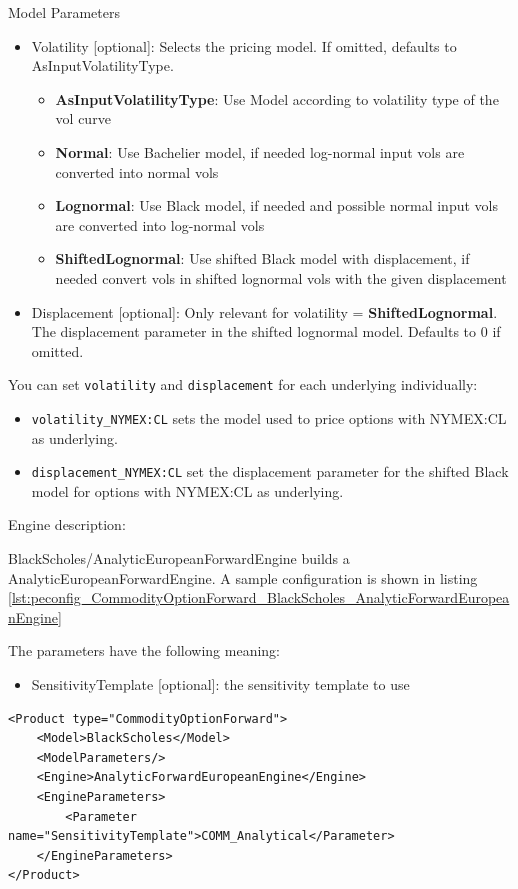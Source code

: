 Model Parameters
\begin{itemize}
    \item Volatility [optional]: Selects the pricing model. If omitted, defaults to AsInputVolatilityType.
    \begin{itemize}
        \item \textbf{AsInputVolatilityType}: Use Model according to volatility type of the vol curve
        \item \textbf{Normal}: Use Bachelier model, if needed log-normal input vols are converted into normal vols
        \item \textbf{Lognormal}: Use Black model, if needed and possible normal input vols are converted into log-normal vols
        \item \textbf{ShiftedLognormal}: Use shifted Black model with displacement, if needed convert vols in shifted lognormal vols with the given displacement
    \end{itemize}
    \item Displacement [optional]: Only relevant for volatility = \textbf{ShiftedLognormal}. The displacement parameter in the shifted lognormal model. Defaults to 0 if omitted.
\end{itemize}

You can set \texttt{volatility} and \texttt{displacement} for each underlying individually:
\begin{itemize}
    \item \texttt{volatility\_NYMEX:CL} sets the model used to price options with NYMEX:CL as underlying.
    \item \texttt{displacement\_NYMEX:CL} set the displacement parameter for the shifted Black model for options with NYMEX:CL as underlying.
\end{itemize}

Engine description:

BlackScholes/AnalyticEuropeanForwardEngine builds a AnalyticEuropeanForwardEngine. A sample configuration is shown in listing
\ref{lst:peconfig_CommodityOptionForward_BlackScholes_AnalyticForwardEuropeanEngine}

The parameters have the following meaning:

\begin{itemize}
\item SensitivityTemplate [optional]: the sensitivity template to use
\end{itemize}

\begin{longlisting}
\begin{verbatim}
<Product type="CommodityOptionForward">
    <Model>BlackScholes</Model>
    <ModelParameters/>
    <Engine>AnalyticForwardEuropeanEngine</Engine>
    <EngineParameters>
        <Parameter name="SensitivityTemplate">COMM_Analytical</Parameter>
    </EngineParameters>
</Product>
\end{verbatim}
\caption{Configuration for Product CommodityOptionForward, Model BlackScholes, Engine AnalyticForwardEuropeanEngine}
\label{lst:peconfig_CommodityOptionForward_BlackScholes_AnalyticForwardEuropeanEngine}
\end{longlisting}

